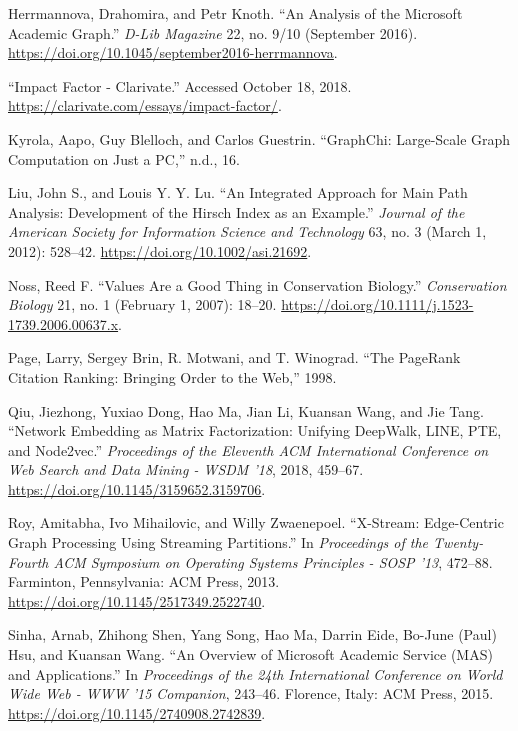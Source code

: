 \documentclass[lettepaper,]{article}
\begin{document}
\leavevmode\hypertarget{ref-herrmannovaAnalysisMicrosoftAcademic2016}{}%
Herrmannova, Drahomira, and Petr Knoth. ``An Analysis of the Microsoft
Academic Graph.'' \emph{D-Lib Magazine} 22, no. 9/10 (September 2016).
\url{https://doi.org/10.1045/september2016-herrmannova}.

\leavevmode\hypertarget{ref-ImpactFactorClarivate}{}%
``Impact Factor - Clarivate.'' Accessed October 18, 2018.
\url{https://clarivate.com/essays/impact-factor/}.

\leavevmode\hypertarget{ref-kyrolaGraphChiLargeScaleGraph}{}%
Kyrola, Aapo, Guy Blelloch, and Carlos Guestrin. ``GraphChi: Large-Scale
Graph Computation on Just a PC,'' n.d., 16.

\leavevmode\hypertarget{ref-liuIntegratedApproachMain2012}{}%
Liu, John S., and Louis Y. Y. Lu. ``An Integrated Approach for Main Path
Analysis: Development of the Hirsch Index as an Example.'' \emph{Journal
of the American Society for Information Science and Technology} 63, no.
3 (March 1, 2012): 528--42. \url{https://doi.org/10.1002/asi.21692}.

\leavevmode\hypertarget{ref-nossValuesAreGood2007a}{}%
Noss, Reed F. ``Values Are a Good Thing in Conservation Biology.''
\emph{Conservation Biology} 21, no. 1 (February 1, 2007): 18--20.
\url{https://doi.org/10.1111/j.1523-1739.2006.00637.x}.

\leavevmode\hypertarget{ref-pagePageRankCitationRanking1998}{}%
Page, Larry, Sergey Brin, R. Motwani, and T. Winograd. ``The PageRank
Citation Ranking: Bringing Order to the Web,'' 1998.

\leavevmode\hypertarget{ref-qiuNetworkEmbeddingMatrix2018}{}%
Qiu, Jiezhong, Yuxiao Dong, Hao Ma, Jian Li, Kuansan Wang, and Jie Tang.
``Network Embedding as Matrix Factorization: Unifying DeepWalk, LINE,
PTE, and Node2vec.'' \emph{Proceedings of the Eleventh ACM International
Conference on Web Search and Data Mining - WSDM '18}, 2018, 459--67.
\url{https://doi.org/10.1145/3159652.3159706}.

\leavevmode\hypertarget{ref-royXStreamEdgecentricGraph2013}{}%
Roy, Amitabha, Ivo Mihailovic, and Willy Zwaenepoel. ``X-Stream:
Edge-Centric Graph Processing Using Streaming Partitions.'' In
\emph{Proceedings of the Twenty-Fourth ACM Symposium on Operating
Systems Principles - SOSP '13}, 472--88. Farminton, Pennsylvania: ACM
Press, 2013. \url{https://doi.org/10.1145/2517349.2522740}.

\leavevmode\hypertarget{ref-sinhaOverviewMicrosoftAcademic2015}{}%
Sinha, Arnab, Zhihong Shen, Yang Song, Hao Ma, Darrin Eide, Bo-June
(Paul) Hsu, and Kuansan Wang. ``An Overview of Microsoft Academic
Service (MAS) and Applications.'' In \emph{Proceedings of the 24th
International Conference on World Wide Web - WWW '15 Companion},
243--46. Florence, Italy: ACM Press, 2015.
\url{https://doi.org/10.1145/2740908.2742839}.
\end{document}
